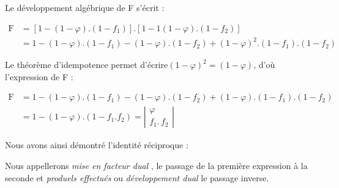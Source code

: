 Le développement algébrique de \og F \fg{} s'écrit :\medskip

$\begin{array}{rl}
\textrm{F} & =\left[1-\left(1-\varphi\right).\left(1-f_{1}\right)\right].\left[1-1\left(1-\varphi\right).\left(1-f_{2}\right)\right]\\
 & =1-\left(1-\varphi\right).\left(1-f_{1}\right)-\left(1-\varphi\right).\left(1-f_{2}\right)+\left(1-\varphi\right)^{2}.\left(1-f_{1}\right).\left(1-f_{2}\right)
\end{array}$\medskip

Le théorème d'idempotence permet d'écrire$\left(1-\varphi\right)^{2}=\left(1-\varphi\right)$,
d'où l'expression de \og F \fg{} :\medskip

$\begin{array}{rl}
\textrm{F} & =1-\left(1-\varphi\right).\left(1-f_{1}\right)-\left(1-\varphi\right).\left(1-f_{2}\right)+\left(1-\varphi\right).\left(1-f_{1}\right).\left(1-f_{2}\right)\\
 & =1-\left(1-\varphi\right).\left(1-f_{1}.f_{2}\right)=\left|\begin{array}{c}
\varphi\\
f_{1}.\,f_{2}
\end{array}\right|
\end{array}$

Nous avons ainsi démontré l'identité réciproque :\medskip

\begin{center}
\end{center}

Nous appellerons \og \emph{mise en facteur dual} \fg{}, le passage
de la première expression à la seconde et \og \emph{produels effectués} \fg{}
ou \og \emph{développement dual} \fg{} le passage inverse.

